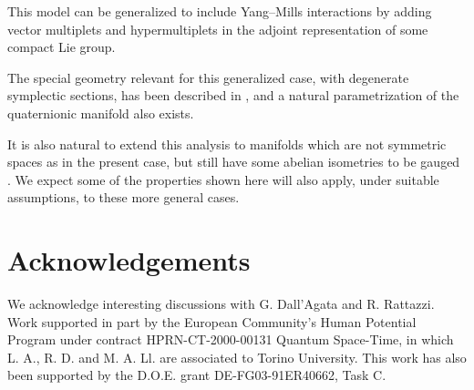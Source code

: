 \documentclass[a4paper,12pt]{article}
\begin{document}
This model can be generalized to include Yang--Mills interactions by adding \coordHE{} vector multiplets and \coordHE{} hypermultiplets in the
adjoint representation of some compact Lie group.

The special geometry relevant for this generalized case, with degenerate symplectic sections, has been described in \cite{dflv},
and a natural parametrization of the quaternionic manifold also exists.

It is also natural to extend this analysis to manifolds which are not symmetric spaces as in the present case, but 
still have some abelian isometries to be gauged \cite{louis}.
We expect some of the properties shown here will also apply, under suitable assumptions, to these more general cases.


 

\section*{Acknowledgements}
We acknowledge interesting discussions with G. Dall'Agata and R. Rattazzi.
 Work
supported in part by the European Community's Human Potential
Program under contract HPRN-CT-2000-00131 Quantum Space-Time, in
which L. A.,  R. D. and M. A. Ll. are associated to Torino
University. This work has also  been supported by the
D.O.E. grant DE-FG03-91ER40662, Task C.
\end{document}
